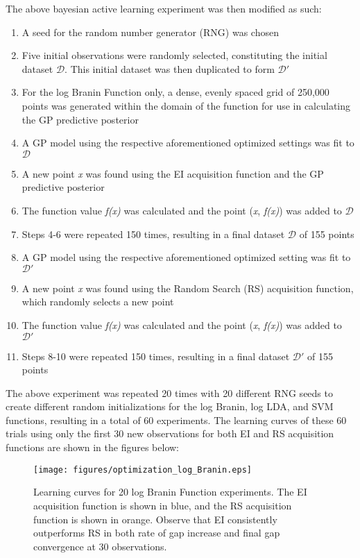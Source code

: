 \documentclass[11pt]{article}
\numberwithin{equation}{section}
\begin{document}
The above bayesian active learning experiment was then modified as such:
\begin{enumerate}
  \item A seed for the random number generator (RNG) was chosen
  \item Five initial observations were randomly selected, constituting the initial dataset $\mathcal{D}$. This initial dataset was then duplicated to form $\mathcal{D'}$
  \item For the log Branin Function only, a dense, evenly spaced grid of 250,000 points was generated within the domain of the function for use in calculating the GP predictive posterior
  \item A GP model using the respective aforementioned optimized settings was fit to $\mathcal{D}$
  \item A new point \emph{x} was found using the EI acquisition function and the GP predictive posterior
  \item The function value \emph{f(x)} was calculated and the point (\emph{x}, \emph{f(x)}) was added to $\mathcal{D}$
  \item Steps 4-6 were repeated 150 times, resulting in a final dataset $\mathcal{D}$ of 155 points
  \item A GP model using the respective aforementioned optimized setting was fit to $\mathcal{D'}$
  \item A new point \emph{x} was found using the Random Search (RS) acquisition function, which randomly selects a new point
  \item The function value \emph{f(x)} was calculated and the point (\emph{x}, \emph{f(x)}) was added to $\mathcal{D'}$
  \item Steps 8-10 were repeated 150 times, resulting in a final dataset $\mathcal{D'}$ of 155 points
\end{enumerate}
The above experiment was repeated 20 times with 20 different RNG seeds to create different random initializations for the log Branin, log LDA, and SVM functions, resulting in a total of 60 experiments. 
The learning curves of these 60 trials using only the first 30 new observations for both EI and RS acquisition functions are shown in the figures below:
\begin{figure}[H]
  \centering
  \texttt{[image: figures/optimization\_log\_Branin.eps]}
  \caption{Learning curves for 20 log Branin Function experiments. The EI acquisition function is shown in blue, and the RS acquisition function is shown in orange. Observe that EI consistently outperforms RS in both rate of gap increase and final gap convergence at 30 observations.}
  \label{fig:ei-v-rand-branin}
\end{figure}
\end{document}
